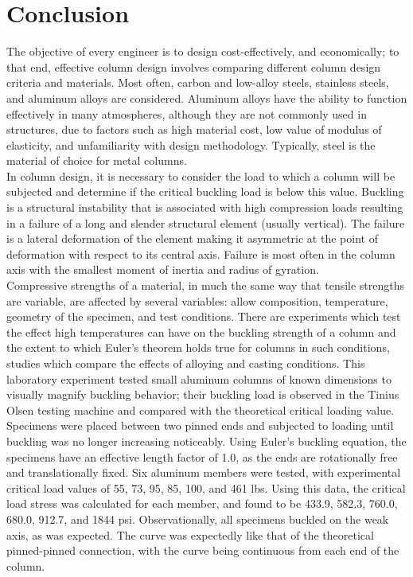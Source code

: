 \documentclass{article}
\begin{document}
    \section{Conclusion}
    \indent The objective of every engineer is to design cost-effectively, and economically; to that end, effective column design involves comparing different column design criteria and materials. Most often, carbon and low-alloy steels, stainless steels, and aluminum alloys are considered. Aluminum alloys have the ability to function effectively in many atmospheres, although they are not commonly used in structures, due to factors such as high material cost, low value of modulus of elasticity, and unfamiliarity with design methodology. Typically, steel is the material of choice for metal columns.\\
    \indent In column design, it is necessary to consider the load to which a column will be subjected and determine if the critical buckling load is below this value. Buckling is a structural instability that is associated with high compression loads resulting in a failure of a long and slender structural element (usually vertical). The failure is a lateral deformation of the element making it asymmetric at the point of deformation with respect to its central axis. Failure is most often in the column axis with the smallest moment of inertia and radius of gyration.  \\
    \indent Compressive strengths of a material, in much the same way that tensile strengths are variable, are affected by several variables: allow composition, temperature, geometry of the specimen, and test conditions. There are experiments which test the effect high temperatures can have on the buckling strength of a column and the extent to which Euler’s theorem holds true for columns in such conditions, studies which compare the effects of alloying and casting conditions. This laboratory experiment tested small aluminum columns of known dimensions to visually magnify buckling behavior; their buckling load is observed in the Tinius Olsen testing machine and compared with the theoretical critical loading value. Specimens were placed between two pinned ends and subjected to loading until buckling was no longer increasing noticeably. Using Euler’s buckling equation, the specimens have an effective length factor of 1.0, as the ends are rotationally free and translationally fixed. Six aluminum members were tested, with experimental critical load values of 55, 73, 95, 85, 100, and 461 lbs. Using this data, the critical load stress was calculated for each member, and found to be 433.9, 582.3, 760.0, 680.0, 912.7, and 1844 psi. Observationally, all specimens buckled on the weak axis, as was expected. The curve was expectedly like that of the theoretical pinned-pinned connection, with the curve being continuous from each end of the column. \\
\end{document}
